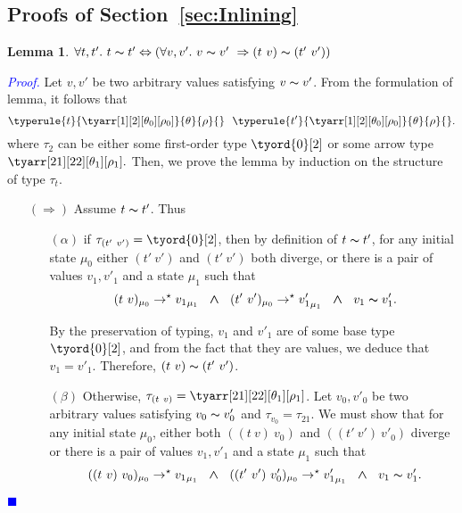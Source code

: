 \documentclass[a4paper,11pt,oneside]{article}
\theoremstyle{plain}
\newtheorem{lemma}[definition]{Lemma}
\renewenvironment{proof}{\noindent \begin{adjustwidth}{1.5em}{} \textcolor{blue}{\textit{Proof.}}}
{{\begin{tiny}\textcolor{blue}{$\blacksquare$}\end{tiny}}
\end{adjustwidth}~\\\noindent}
\newcommand{\tmapp}[2]{(#1 ~ #2)}
\newcommand{\ty}[1][]{\tau_{#1}}
\newcommand{\bwedge}{\boldsymbol{~\wedge~}}
\newcommand{\evalstar}[4]{~#1_{\mu_#2} \rightarrow^{\star} #3_{\mu_#4} ~}
\newcommand{\eqv}[1]{#1 \thicksim #1'}
\begin{document}
	
	



	\subsection{Proofs of Section~\ref{sec:Inlining}}
	\begin{lemma}
		$\forall t,t'.~ \eqv{t} \Leftrightarrow 
			(\forall v, v'.~\eqv{v}~\Rightarrow
			\tmapp{t}{v} \thicksim \tmapp{t'}{v'})$
	\label{equiv-def-p}
	\end{lemma}

	\begin{proof}
		Let $v, v'$ be two arbitrary values satisfying $\eqv{v}$.
		From the formulation of lemma, it follows that
		$$	\typerule{t}{\tyarr[1][2][\theta_0][\rho_0]}{\theta}{\rho}{} ~~ 
				\typerule{t'}{\tyarr[1][2][\theta_0][\rho_0]}{\theta}{\rho}{}.$$
		where $\ty[2]$ can be either some first-order type $\tyord{0}[2]$ or
		some arrow type $\tyarr[21][22][\theta_1][\rho_1].$ 
		Then, we prove the lemma by induction on the structure of type $\ty[t]$.
	\begin{itemize}		
	
		\item[$(\Rightarrow)$] Assume $\eqv{t}$. Thus 		
		
		\begin{itemize}
		
		\item[$(\alpha)$] if $\ty[\tmapp{t'}{v'}] = \tyord{0}[2]$, then
		by definition of $\eqv{t}$, for any initial state $\mu_0$ either 
		$\tmapp{t'}{v'}$ and $\tmapp{t'}{v'}$ both diverge, 
		or there is a pair of values $v_1, v'_1$ and a state $\mu_1$ such that 
		$$\evalstar{\tmapp{t}{v}}{0}{{v_1}}{1} 
			\bwedge \evalstar{\tmapp{t'}{v'}}{0}{{v'_1}}{1} \bwedge~\eqv{v_1}.$$
		
		By the preservation of typing, $v_1$ and $v'_1$ are of some base 
		type $\tyord{0}[2]$, and from the fact that they are values, we deduce
		that $v_1 = v'_1$. Therefore,  $\tmapp{t}{v} \thicksim \tmapp{t'}{v'}$.
			
		\item[$(\beta)$] Otherwise, 
		$\ty[\tmapp{t}{v}] = \tyarr[21][22][\theta_1][\rho_1]$.
		Let $v_0, v'_0$ be two arbitrary values satisfying $\eqv{v_0}$ and 
		$\ty[v_0] = \ty[21]$. We must show that for any initial state $\mu_0$,
		either both 
		$\tmapp{\tmapp{t}{v}}{v_0}$ and $\tmapp{\tmapp{t'}{v'}}{v'_0}$ diverge
		or there is a pair of values $v_1, v'_1$ and a state $\mu_1$ such that 
		$$\evalstar{\tmapp{\tmapp{t}{v}}{v_0}}{0}{{v_1}}{1} \bwedge
		\evalstar{\tmapp{\tmapp{t'}{v'}}{v'_0}}{0}{{v'_1}}{1} \bwedge~\eqv{v_1}.$$
		

\end{itemize}
\end{itemize}
\end{proof}
\end{document}
